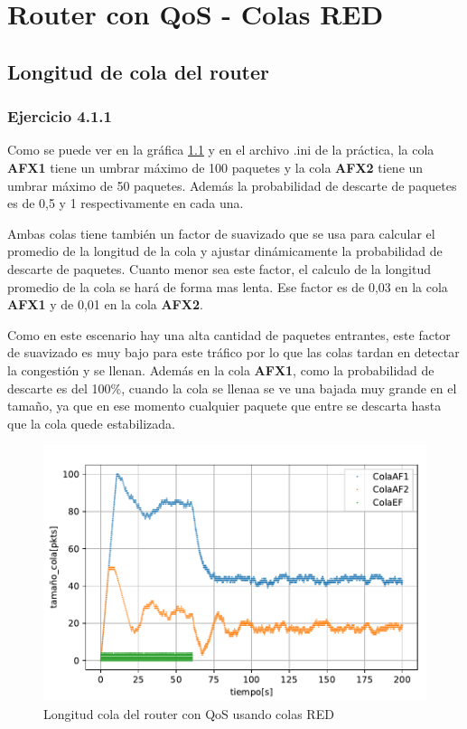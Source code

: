 \chapter{Router con QoS - Colas RED}
\label{chap:colasRED}

\section{Longitud de cola del router}

\subsection{Ejercicio 4.1.1} \label{chap:ejercicio411}
Como se puede ver en la gráfica \ref{fig:colasRED_tam} y en el archivo .ini de la práctica, la cola \textbf{AFX1} tiene un umbrar máximo de 100 paquetes y la cola
\textbf{AFX2} tiene un umbrar máximo de 50 paquetes. Además la probabilidad de descarte de paquetes es de 0,5 y 1 respectivamente en cada una.

Ambas colas tiene también un factor de suavizado que se usa para calcular el promedio de la longitud de la cola y ajustar dinámicamente la probabilidad
de descarte de paquetes. Cuanto menor sea este factor, el calculo de la longitud promedio de la cola se hará de forma mas lenta. 
Ese factor es de 0,03 en la cola \textbf{AFX1} y de 0,01 en la cola \textbf{AFX2}.

Como en este escenario hay una alta cantidad de paquetes entrantes, este factor de suavizado es muy bajo para este tráfico por lo que las colas tardan en detectar
la congestión y se llenan. Además en la cola \textbf{AFX1}, como la probabilidad de descarte es del 100\%, cuando la cola se llenaa se ve una
bajada muy grande en el tamaño, ya que en ese momento cualquier paquete que entre se descarta hasta que la cola quede estabilizada. 


\begin{figure}[!ht]
    \centering
    \includegraphics{graficas/RED/tamao_cola_red.pdf}
    \caption{Longitud cola del router con QoS usando colas RED}
    \label{fig:colasRED_tam}
\end{figure}


